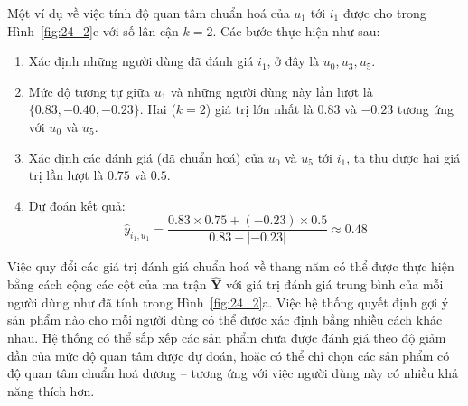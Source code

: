 Một ví dụ về việc tính độ quan tâm chuẩn hoá của $u_1$ tới $i_1$ được cho
trong Hình~\ref{fig:24_2}e với số lân cận $k = 2$. Các
bước thực hiện như sau:
\begin{enumerate}
    \item Xác định những người dùng đã đánh giá $i_1$, ở đây là $u_0, u_3,
    u_5$.
     
    \item  Mức độ tương tự giữa $u_1$ và những người dùng
    này lần lượt là $\{0.83, -0.40, -0.23\}$. Hai ($k = 2$) giá trị lớn nhất là
    $0.83$ và $-0.23$ tương ứng với $u_0$ và $u_5$.
     
    \item Xác định các đánh giá (đã chuẩn hoá) của $u_0$ và $u_5$ tới $i_1$, ta
    thu được hai giá trị lần lượt là $0.75$ và $0.5$.
     
    \item Dự đoán kết quả:
    \begin{equation} 
        \hat{y}_{i_1, u_1} = \frac{0.83\times 0.75 + (-0.23)\times 0.5}{0.83 + |-0.23|} \approx 0.48 
    \end{equation} 
\end{enumerate}
 
Việc quy đổi các giá trị đánh giá chuẩn hoá về thang năm có thể được thực hiện
bằng cách cộng các cột của ma trận $\hat{\mathbf{Y}}$ với giá trị
đánh giá trung bình của mỗi người dùng như đã tính trong
Hình~\ref{fig:24_2}a. Việc hệ thống quyết định gợi ý sản phẩm nào cho mỗi
người dùng có thể được xác định bằng nhiều cách khác nhau. Hệ thống có thể
sắp xếp các sản phẩm chưa được đánh giá theo độ giảm dần của mức độ quan tâm được dự đoán, hoặc có thể chỉ chọn các sản phẩm có độ quan tâm chuẩn hoá dương -- tương ứng với việc người dùng
này có nhiều khả năng thích hơn.
 
 
 
